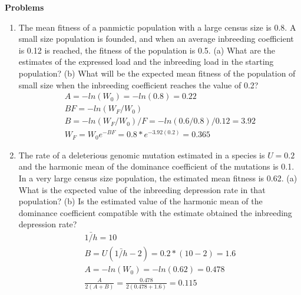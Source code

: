 \documentclass[12pt]{amsart}
\begin{document}
{\large \bf Problems}   
\begin{enumerate}
\item The mean fitness of a panmictic population with a large census size is 0.8. A small size population is founded, and when an average inbreeding coefficient is 0.12 is reached, the fitness of the population is 0.5. (a) What are the estimates of the expressed load and the inbreeding load in the starting population? (b) What will be the expected mean fitness of the population of small size when the inbreeding coefficient reaches the value of 0.2?
\begin{gather*}
A = -ln(W_0) = -ln(0.8)=0.22\\
BF = -ln(W_F/W_0) \\
B = -ln(W_F/W_0)/F = -ln(0.6/0.8)/0.12 = 3.92\\
W_F = W_0e^{-BF} = 0.8*e^{-3.92(0.2)} = 0.365
\end{gather*}

\item The rate of a deleterious genomic mutation estimated in a species is $U = 0.2$ and the harmonic mean of the dominance coefficient of the mutations is 0.1. In a very large census size population, the estimated mean fitness is 0.62. (a) What is the expected value of the inbreeding depression rate in that population? (b) Is the estimated value of the harmonic mean of the dominance coefficient compatible with the estimate obtained the inbreeding depression rate?
\begin{gather*}
\bar{1/h} = 10 \\
B = U(\bar{1/h}-2) = 0.2*(10-2)=1.6\\
A = -ln(W_0) = -ln(0.62) = 0.478\\
\frac{A}{2(A+B)} = \frac{0.478}{2(0.478 + 1.6)} = 0.115
\end{gather*}


\end{enumerate}
\end{document}
